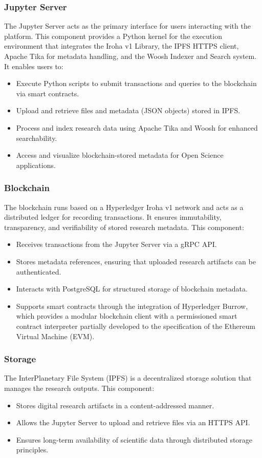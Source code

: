 \documentclass{article}
\begin{document}
\subsubsection{Jupyter Server}
The Jupyter Server acts as the primary interface for users interacting with the platform. This component provides a Python kernel for the execution environment that integrates the Iroha v1 Library, the IPFS HTTPS client, Apache Tika for metadata handling, and the Woosh Indexer and Search system. It enables users to:

\begin{itemize}
      \item Execute Python scripts to submit transactions and queries to the blockchain via smart contracts.
      \item Upload and retrieve files and metadata (JSON objects) stored in IPFS.
      \item Process and index research data using Apache Tika and Woosh for enhanced searchability.
      \item Access and visualize blockchain-stored metadata for Open Science applications.
\end{itemize}

\subsubsection{Blockchain}
The blockchain runs based on a Hyperledger Iroha v1 network and acts as a distributed ledger for recording transactions. It ensures immutability, transparency, and verifiability of stored research metadata. This component:
\begin{itemize}
      \item Receives transactions from the Jupyter Server via a gRPC API.
      \item Stores metadata references, ensuring that uploaded research artifacts can be authenticated.
      \item Interacts with PostgreSQL for structured storage of blockchain metadata.
      \item Supports smart contracts through the integration of Hyperledger Burrow, which provides a modular blockchain client with a permissioned smart contract interpreter partially developed to the specification of the Ethereum Virtual Machine (EVM).

\end{itemize}

\subsubsection{Storage}
The InterPlanetary File System (IPFS) is a decentralized storage solution that manages the research outputs. This component:
\begin{itemize}
      \item Stores digital research artifacts in a content-addressed manner.
      \item Allows the Jupyter Server to upload and retrieve files via an HTTPS API.
      \item Ensures long-term availability of scientific data through distributed storage principles.
\end{itemize}
\end{document}
